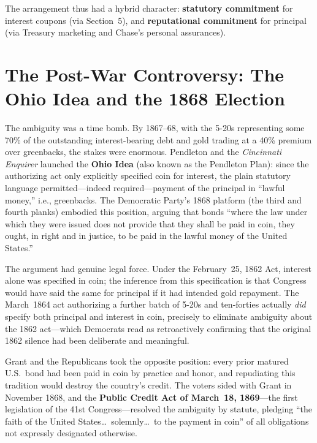 \documentclass[12pt]{article}
\begin{document}
The arrangement thus had a hybrid character: \textbf{statutory commitment}
for interest coupons (via Section~5), and \textbf{reputational commitment}
for principal (via Treasury marketing and Chase's personal assurances).

\section{The Post-War Controversy: The Ohio Idea and the 1868 Election}

The ambiguity was a time bomb. By 1867--68, with the 5-20s representing
some 70\% of the outstanding interest-bearing debt and gold trading at a
40\% premium over greenbacks, the stakes were enormous. Pendleton and the
\textit{Cincinnati Enquirer} launched the \textbf{Ohio Idea} (also known
as the Pendleton Plan): since the authorizing act only explicitly specified
coin for interest, the plain statutory language permitted---indeed
required---payment of the principal in ``lawful money,'' i.e., greenbacks.
The Democratic Party's 1868 platform (the third and fourth planks) embodied
this position, arguing that bonds ``where the law under which they were
issued does not provide that they shall be paid in coin, they ought, in
right and in justice, to be paid in the lawful money of the United States.''

The argument had genuine legal force. Under the February~25, 1862 Act,
interest alone was specified in coin; the inference from this specification
is that Congress would have said the same for principal if it had intended
gold repayment. The March~1864 act authorizing a further batch of 5-20s
and ten-forties actually \textit{did} specify both principal and interest
in coin, precisely to eliminate ambiguity about the 1862 act---which
Democrats read as retroactively confirming that the original 1862 silence
had been deliberate and meaningful.

Grant and the Republicans took the opposite position: every prior matured
U.S.\ bond had been paid in coin by practice and honor, and repudiating
this tradition would destroy the country's credit. The voters sided with
Grant in November 1868, and the \textbf{Public Credit Act of March~18,
1869}---the first legislation of the 41st Congress---resolved the
ambiguity by statute, pledging ``the faith of the United States\ldots\
solemnly\ldots\ to the payment in coin'' of all obligations not expressly
designated otherwise.
\end{document}
